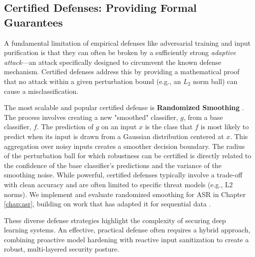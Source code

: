 \documentclass[../main.tex]{subfiles}
\begin{document}
\subsection{Certified Defenses: Providing Formal Guarantees}
A fundamental limitation of empirical defenses like adversarial training and input purification is that they can often be broken by a sufficiently strong \textit{adaptive attack}—an attack specifically designed to circumvent the known defense mechanism. Certified defenses address this by providing a mathematical proof that no attack within a given perturbation bound (e.g., an $L_2$ norm ball) can cause a misclassification.

The most scalable and popular certified defense is \textbf{Randomized Smoothing} \cite{cohen2019certified}. The process involves creating a new "smoothed" classifier, $g$, from a base classifier, $f$. The prediction of $g$ on an input $x$ is the class that $f$ is most likely to predict when its input is drawn from a Gaussian distribution centered at $x$. This aggregation over noisy inputs creates a smoother decision boundary. The radius of the perturbation ball for which robustness can be certified is directly related to the confidence of the base classifier's predictions and the variance of the smoothing noise. While powerful, certified defenses typically involve a trade-off with clean accuracy and are often limited to specific threat models (e.g., L2 norms). We implement and evaluate randomized smoothing for ASR in Chapter \ref{chap:asr}, building on work that has adapted it for sequential data \cite{olivier2022sequential}.

These diverse defense strategies highlight the complexity of securing deep learning systems. An effective, practical defense often requires a hybrid approach, combining proactive model hardening with reactive input sanitization to create a robust, multi-layered security posture.
\end{document}
